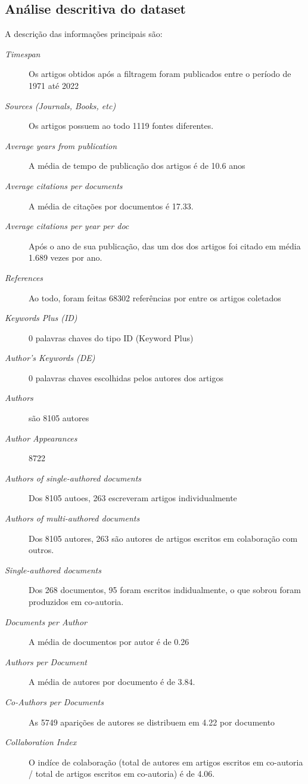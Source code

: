 \subsection{Análise descritiva do dataset}

A descrição das informações principais são:

\begin{description}
    \item [\textit{Timespan}] Os artigos obtidos após a filtragem foram publicados entre o período de 1971 até 2022
    \item [\textit{Sources (Journals, Books, etc)}] Os artigos possuem ao todo 1119 fontes diferentes.
    \item [\textit{Average years from publication}] A média de tempo de publicação dos artigos é de 10.6 anos
    \item [\textit{Average citations per documents}] A média de citações por documentos é 17.33.
    \item [\textit{Average citations per year per doc}] Após o ano de sua publicação, das um dos dos artigos foi citado em média 1.689 vezes por ano.
    \item [\textit{References}] Ao todo, foram feitas 68302 referências por entre os artigos coletados
    \item [\textit{Keywords Plus (ID)}] 0 palavras chaves do tipo ID (Keyword Plus)
    \item [\textit{Author's Keywords (DE)}]  0 palavras chaves escolhidas pelos autores dos artigos

    \item [\textit{Authors}]  são 8105 autores
    \item [\textit{Author Appearances}] 8722
    \item [\textit{Authors of single-authored documents}] Dos 8105 autoes, 263 escreveram artigos individualmente
    \item [\textit{Authors of multi-authored documents}] Dos 8105 autores, 263 são autores de artigos escritos em colaboração com outros.
    \item [\textit{Single-authored documents}] Dos 268 documentos, 95 foram escritos indidualmente, o que sobrou foram produzidos em co-autoria.
    \item [\textit{Documents per Author}] A média de documentos por autor é de 0.26
    \item [\textit{Authors per Document}] A média de autores por documento é de 3.84.
    \item [\textit{Co-Authors per Documents}] As 5749 aparições de autores se distribuem em 4.22 por documento
    \item [\textit{Collaboration Index}] O indíce de colaboração (total de autores em artigos escritos em co-autoria / total de artigos escritos em co-autoria) é de 4.06.
\end{description}